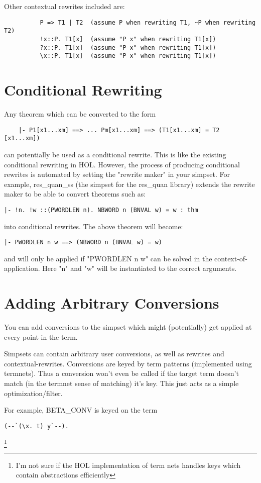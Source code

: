 Other contextual rewrites included are:
\begin{verbatim}
	      P => T1 | T2  (assume P when rewriting T1, ~P when rewriting T2)
	      !x::P. T1[x]  (assume "P x" when rewriting T1[x])
	      ?x::P. T1[x]  (assume "P x" when rewriting T1[x])
	      \x::P. T1[x]  (assume "P x" when rewriting T1[x])
\end{verbatim}


\section{Conditional Rewriting}

Any theorem which can be converted to the form
\begin{verbatim}
	|- P1[x1...xm] ==> ... Pm[x1...xm] ==> (T1[x1...xm] = T2 [x1...xm])
\end{verbatim}
can potentially be used as a conditional rewrite.  This is 
like the existing conditional rewriting in HOL.  However, the process
of producing conditional rewrites is automated by setting the "rewrite
maker" in your simpset.  For example, res\_quan\_ss (the simpset
for the res\_quan library) extends the rewrite maker to be able to convert
theorems such as:
\begin{verbatim}
|- !n. !w ::(PWORDLEN n). NBWORD n (BNVAL w) = w : thm
\end{verbatim}
into conditional rewrites.  The above theorem will become:
\begin{verbatim}
|- PWORDLEN n w ==> (NBWORD n (BNVAL w) = w)
\end{verbatim}
and will only be applied if "PWORDLEN n w" can be solved in the
context-of-application.  Here "n" and "w" will be instantiated
to the correct arguments.

\section{Adding Arbitrary Conversions}

You can add conversions to the simpset which might (potentially)
get applied at every point in the term. 

Simpsets can contain arbitrary user conversions, as well as
rewrites and contextual-rewrites.  Conversions are keyed by
term patterns (implemented using termnets).  Thus a conversion
won't even be called if the target term doesn't match 
(in the termnet sense of matching) it's key.  This just acts
as a simple optimization/filter.

For example, BETA\_CONV is keyed on the term 
\begin{verbatim}
(--`(\x. t) y`--).  
\end{verbatim}
\footnote{I'm not sure if the HOL implementation of term nets handles keys
which contain abstractions efficiently}


